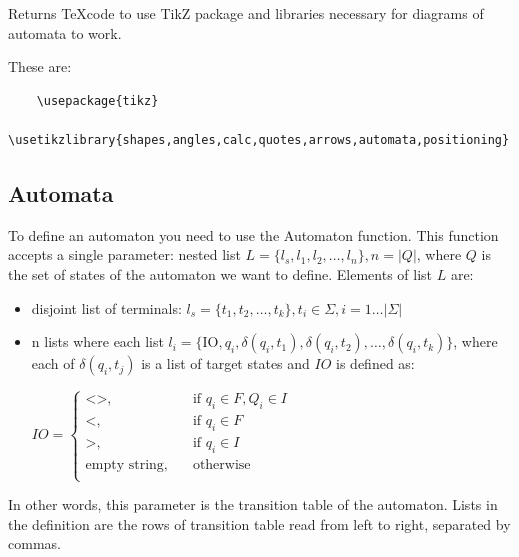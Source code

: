 \documentclass{ctuthesis}
\begin{document}
Returns \TeX code to use TikZ package and libraries necessary for diagrams of automata to work.

These are:
\begin{verbatim}
	\usepackage{tikz}
	\usetikzlibrary{shapes,angles,calc,quotes,arrows,automata,positioning}
\end{verbatim}

\subsection{Automata}
\label{subsec:automata-variables}
To define an automaton you need to use the Automaton function. This function accepts a single parameter: nested list $L = \{l_s, l_1, l_2, \ldots, l_n\}, n = |Q|$, where $Q$ is the set of states of the automaton we want to define.  Elements of list $L$ are:
\begin{itemize}
	\item disjoint list of terminals: $l_s = \{t_1, t_2, \ldots, t_k\}, t_i \in \Sigma, i = 1\ldots |\Sigma|$
	\item n lists where each list $l_i = \{\text{IO}, q_i, \delta(q_i, t_1), \delta(q_i, t_2), \ldots, \delta(q_i, t_k)\}$, where each of $\delta(q_i, t_j)$ is a list of target states and $IO$ is defined as: 
 	
	$IO = 
		\begin{cases}
			\text{<>,} &\quad\text{if }q_i \in F, Q_i \in I \\
			\text{<,} &\quad\text{if }q_i \in F\\
			\text{>,} &\quad\text{if }q_i \in I \\
			\text{empty string,} &\quad\text{otherwise}\\
		\end{cases}$
\end{itemize}

In other words, this parameter is the transition table of the automaton. Lists in the definition are the rows of transition table read from left to right, separated by commas.
\end{document}
